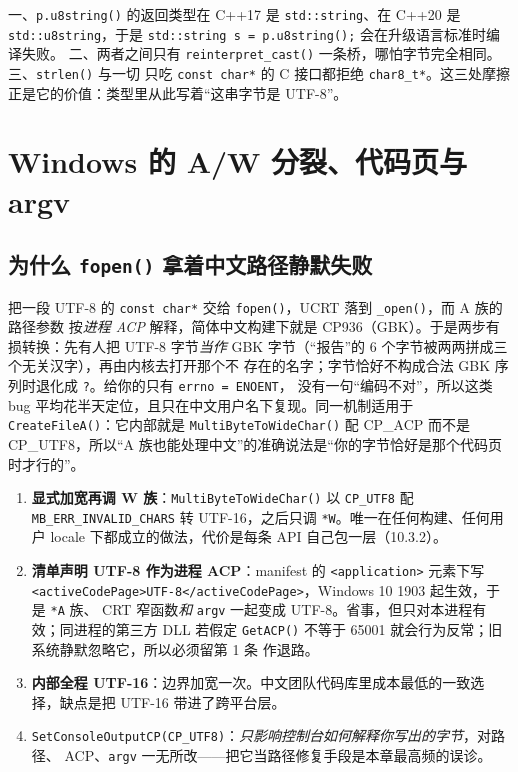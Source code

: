 \documentclass[12pt,a4paper,fontset=fandol]{ctexbook}
\newcommand{\cpp}[1]{C++#1}
\newcommand{\Fn}[1]{\texttt{#1()}}
\newcommand{\Tp}[1]{\texttt{#1}}
\newcommand{\Bk}{\allowbreak}
\begin{document}
\begin{note}[title={char8\_t 的三处编译期摩擦}]
一、\Tp{p.{\Bk}u8string()} 的返回类型在 \cpp{17} 是 \Tp{std::string}、在 \cpp{20} 是
\Tp{std::{\Bk}u8string}，于是 \Tp{std::{\Bk}string s = p.{\Bk}u8string();} 会在升级语言标准时编译失败。
二、两者之间只有 \Fn{reinterpret\_{\Bk}cast} 一条桥，哪怕字节完全相同。三、\Fn{strlen} 与一切
只吃 \Tp{const char*} 的 C 接口都拒绝 \Tp{char8\_t*}。这三处摩擦正是它的价值：类型里从此写着``这串字节是 UTF-8''。
\end{note}

\section{Windows 的 A/W 分裂、代码页与 argv}

\subsection{为什么 \Fn{fopen} 拿着中文路径静默失败}

把一段 UTF-8 的 \Tp{const char*} 交给 \Fn{fopen}，UCRT 落到 \Fn{\_open}，而 A 族的路径参数
按\emph{进程 ACP} 解释，简体中文构建下就是 CP936（GBK）。于是两步有损转换：先有人把 UTF-8
字节\emph{当作} GBK 字节（``报告''的 6 个字节被两两拼成三个无关汉字），再由内核去打开那个不
存在的名字；字节恰好不构成合法 GBK 序列时退化成 \Tp{?}。给你的只有 \Tp{errno = ENOENT}，
没有一句``编码不对''，所以这类 bug 平均花半天定位，且只在中文用户名下复现。同一机制适用于
\Fn{CreateFileA}：它内部就是 \Fn{MultiByteToWideChar} 配 CP\_ACP 而不是 CP\_UTF8，所以``A
族也能处理中文''的准确说法是``你的字节恰好是那个代码页时才行的''。

\begin{warning}[title={四条出路与各自的边界}]
\begin{enumerate}[label=\arabic*.,leftmargin=2.2em]
\item \textbf{显式加宽再调 W 族}：\Fn{Multi{\Bk}Byte{\Bk}To{\Bk}Wide{\Bk}Char} 以 \Tp{CP\_UTF8} 配
      \Tp{MB\_{\Bk}ERR\Bk \_{\Bk}INVALID\_{\Bk}CHARS} 转 UTF-16，之后只调 \Tp{*W}。唯一在任何构建、任何用户
      locale 下都成立的做法，代价是每条 API 自己包一层（10.3.2）。
\item \textbf{清单声明 UTF-8 作为进程 ACP}：manifest 的 \Tp{<application>} 元素下写
      \Tp{<activeCodePage>UTF-8</activeCodePage>}，Windows 10 1903 起生效，于是 \Tp{*A} 族、
      CRT 窄函数\emph{和} \Tp{argv} 一起变成 UTF-8。省事，但只对本进程有效；同进程的第三方
      DLL 若假定 \Fn{GetACP} 不等于 65001 就会行为反常；旧系统静默忽略它，所以必须留第 1 条
      作退路。
\item \textbf{内部全程 UTF-16}：边界加宽一次。中文团队代码库里成本最低的一致选择，缺点是把
      UTF-16 带进了跨平台层。
\item \Tp{SetConsoleOutputCP(CP\_UTF8)}：\emph{只影响控制台如何解释你写出的字节}，对路径、
      ACP、\Tp{argv} 一无所改——把它当路径修复手段是本章最高频的误诊。
\end{enumerate}
\end{warning}
\end{document}
